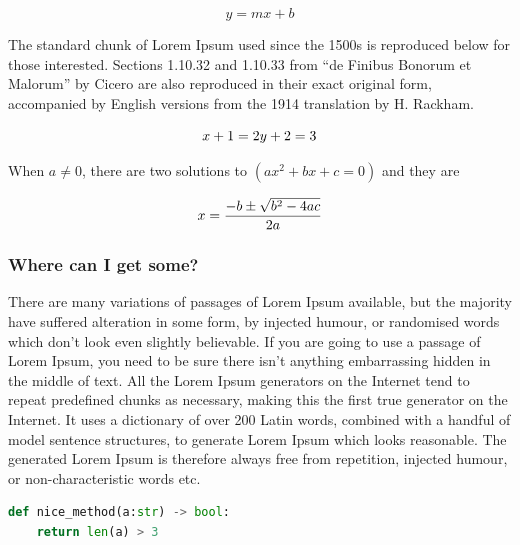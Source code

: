 \documentclass[conference,8pt,portuguese,]{IEEEtran}
\begin{document}
\[ y = mx +b \]

The standard chunk of Lorem Ipsum used since the 1500s is reproduced
below for those interested. Sections 1.10.32 and 1.10.33 from ``de
Finibus Bonorum et Malorum'' by Cicero are also reproduced in their
exact original form, accompanied by English versions from the 1914
translation by H. Rackham.

\begin{equation}
    x+1 = 2 \\
    y+2 = 3 
\end{equation}

When \(a \ne 0\), there are two solutions to \((ax^2 + bx + c = 0)\) and
they are

\[ x = {-b \pm \sqrt{b^2-4ac} \over 2a} \]

\hypertarget{where-can-i-get-some}{%
\subsubsection{Where can I get some?}\label{where-can-i-get-some}}

There are many variations of passages of Lorem Ipsum available, but the
majority have suffered alteration in some form, by injected humour, or
randomised words which don't look even slightly believable. If you are
going to use a passage of Lorem Ipsum, you need to be sure there isn't
anything embarrassing hidden in the middle of text. All the Lorem Ipsum
generators on the Internet tend to repeat predefined chunks as
necessary, making this the first true generator on the Internet. It uses
a dictionary of over 200 Latin words, combined with a handful of model
sentence structures, to generate Lorem Ipsum which looks reasonable. The
generated Lorem Ipsum is therefore always free from repetition, injected
humour, or non-characteristic words etc.

\begin{lstlisting}[language=Python]
def nice_method(a:str) -> bool:
    return len(a) > 3
\end{lstlisting}

\printbibliography

 \nocite{*}
\end{document}
